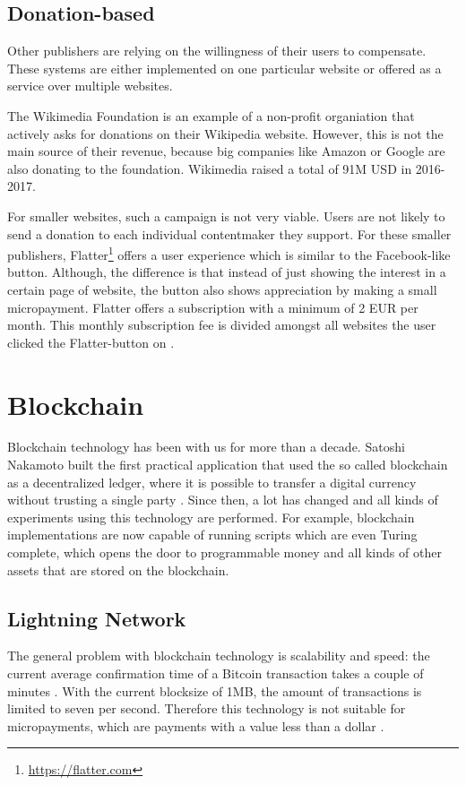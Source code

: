 \subsection{Donation-based}

Other publishers are relying on the willingness of their users to compensate. These systems are either implemented on one particular website or offered as a service over multiple websites. 

The Wikimedia Foundation is an example of a non-profit organiation that actively asks for donations on their Wikipedia website. However, this is not the main source of their revenue, because big companies like Amazon or Google are also donating to the foundation. Wikimedia raised a total of 91M USD in 2016-2017. \cite{wikimediadonation}

For smaller websites, such a campaign is not very viable. Users are not likely to send a donation to each individual contentmaker they support. For these smaller publishers, Flatter\footnote{\url{https://flatter.com}} offers a user experience which is similar to the Facebook-like button. Although, the difference is that instead of just showing the interest in a certain page of website, the button also shows appreciation by making a small micropayment. Flatter offers a subscription with a minimum of 2 EUR per month. This monthly subscription fee is divided amongst all websites the user clicked the Flatter-button on \cite{loll2010flattr}.

\section{Blockchain}

Blockchain technology has been with us for more than a decade. Satoshi Nakamoto built the first practical application that used the so called blockchain as a decentralized ledger, where it is possible to transfer a digital currency without trusting a single party \cite{nakamoto2019bitcoin}. Since then, a lot has changed and all kinds of experiments using this technology are performed. For example, blockchain implementations are now capable of running scripts which are even Turing complete, which opens the door to programmable money \cite{wood2014ethereum} and all kinds of other assets that are stored on the blockchain. 


\subsection{Lightning Network}
The general problem with blockchain technology is scalability and speed: the current average confirmation time of a Bitcoin transaction takes a couple of minutes \cite{bamert2013have}. With the current blocksize of 1MB, the amount of transactions is limited to seven per second. Therefore this technology is not suitable for micropayments, which are payments with a value less than a dollar \cite{definitionmicropayment}.

